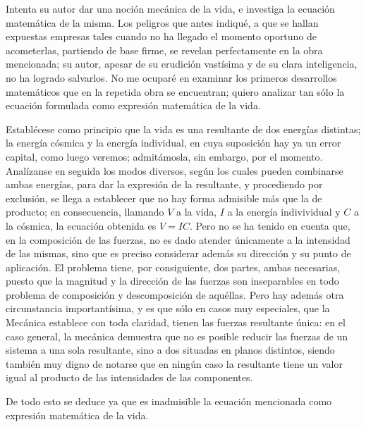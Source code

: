 \documentclass[a4paper, 12pt]{article}
\begin{document}
Intenta su autor dar una noción mecánica de la vida, e investiga la ecuación matemática de la misma. Los peligros que antes indiqué, a que se hallan expuestas empresas tales cuando no ha llegado el momento oportuno de acometerlas, partiendo de base firme, se revelan perfectamente en la obra mencionada; su autor, apesar de su erudición vastísima y de su clara inteligencia, no ha logrado salvarlos. No me ocuparé en examinar los primeros desarrollos matemáticos que en la repetida obra se encuentran; quiero analizar tan sólo la ecuación formulada como expresión matemática de la vida.

Establécese como principio que la vida es una resultante de dos energías distintas; la energía cósmica y la energía individual, en cuya suposición hay ya un error capital, como luego veremos; admitámosla, sin embargo, por el momento. Analízanse en seguida los modos diversos, según los cuales pueden combinarse ambas energías, para dar la expresión de la resultante, y procediendo por exclusión, se llega a establecer que no hay forma admisible más que la de producto; en consecuencia, llamando $V$ a la vida, $I$ a la energía indivividual y $C$ a la cósmica, la ecuación obtenida es $V=IC$. Pero no se ha tenido en cuenta que, en la composición de las fuerzas, no es dado atender únicamente a la intensidad de las mismas, sino que es preciso considerar además su dirección y su punto de aplicación. El problema tiene, por consiguiente, dos partes, ambas necesarias, puesto que la magnitud y la dirección de las fuerzas son inseparables en todo problema de composición y descomposición de aquéllas. Pero hay además otra circunstancia importantísima, y es que sólo en casos muy especiales, que la Mecánica establece con toda claridad, tienen las fuerzas resultante única: en el caso general, la mecánica demuestra que no es posible reducir las fuerzas de un sistema a una sola resultante, sino a dos situadas en planos distintos, siendo también muy digno de notarse que en ningún caso la resultante tiene un valor igual al producto de las intensidades de las componentes.

De todo esto se deduce ya que es inadmisible la ecuación mencionada como expresión matemática de la vida.
\end{document}
